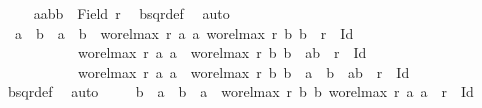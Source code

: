 \begin{isabellebody}
\ \ \isamarkupfalse%
\ {}{\isacharcolon}{\kern0pt}\ {\isachardoublequoteopen}{\isacharbraceleft}{\kern0pt}a{}{\isacharcomma}{\kern0pt}a{}{\isacharcomma}{\kern0pt}b{}{\isacharcomma}{\kern0pt}b{}{\isacharbraceright}{\kern0pt}\ {\isasymle}\ Field\ r{\isachardoublequoteclose}\ \isamarkupfalse%
\ bsqr{\isacharunderscore}{\kern0pt}def\ \isamarkupfalse%
\ auto\isanewline
\ \ \isamarkupfalse%
\ {}{\isacharcolon}{\kern0pt}\ {\isachardoublequoteopen}a{}\ {\isacharequal}{\kern0pt}\ b{}\ {\isasymand}\ a{}\ {\isacharequal}{\kern0pt}\ b{}\ {\isasymor}\ {\isacharparenleft}{\kern0pt}wo{\isacharunderscore}{\kern0pt}rel{\isachardot}{\kern0pt}max{}\ r\ a{}\ a{}{\isacharcomma}{\kern0pt}\ wo{\isacharunderscore}{\kern0pt}rel{\isachardot}{\kern0pt}max{}\ r\ b{}\ b{}{\isacharparenright}{\kern0pt}\ {\isasymin}\ r\ {\isacharminus}{\kern0pt}\ Id\ {\isasymor}\isanewline
\ \ \ \ \ \ \ \ \ \ \ wo{\isacharunderscore}{\kern0pt}rel{\isachardot}{\kern0pt}max{}\ r\ a{}\ a{}\ {\isacharequal}{\kern0pt}\ wo{\isacharunderscore}{\kern0pt}rel{\isachardot}{\kern0pt}max{}\ r\ b{}\ b{}\ {\isasymand}\ {\isacharparenleft}{\kern0pt}a{}{\isacharcomma}{\kern0pt}b{}{\isacharparenright}{\kern0pt}\ {\isasymin}\ r\ {\isacharminus}{\kern0pt}\ Id\ {\isasymor}\isanewline
\ \ \ \ \ \ \ \ \ \ \ wo{\isacharunderscore}{\kern0pt}rel{\isachardot}{\kern0pt}max{}\ r\ a{}\ a{}\ {\isacharequal}{\kern0pt}\ wo{\isacharunderscore}{\kern0pt}rel{\isachardot}{\kern0pt}max{}\ r\ b{}\ b{}\ {\isasymand}\ a{}\ {\isacharequal}{\kern0pt}\ b{}\ {\isasymand}\ {\isacharparenleft}{\kern0pt}a{}{\isacharcomma}{\kern0pt}b{}{\isacharparenright}{\kern0pt}\ {\isasymin}\ r\ {\isacharminus}{\kern0pt}\ Id{\isachardoublequoteclose}\isanewline
\ \ \isamarkupfalse%
\ {\isacharasterisk}{\kern0pt}\ \isamarkupfalse%
\ bsqr{\isacharunderscore}{\kern0pt}def\ \isamarkupfalse%
\ auto\isanewline
\ \ \isamarkupfalse%
\ {}{\isacharcolon}{\kern0pt}\ {\isachardoublequoteopen}b{}\ {\isacharequal}{\kern0pt}\ a{}\ {\isasymand}\ b{}\ {\isacharequal}{\kern0pt}\ a{}\ {\isasymor}\ {\isacharparenleft}{\kern0pt}wo{\isacharunderscore}{\kern0pt}rel{\isachardot}{\kern0pt}max{}\ r\ b{}\ b{}{\isacharcomma}{\kern0pt}\ wo{\isacharunderscore}{\kern0pt}rel{\isachardot}{\kern0pt}max{}\ r\ a{}\ a{}{\isacharparenright}{\kern0pt}\ {\isasymin}\ r\ {\isacharminus}{\kern0pt}\ Id\ {\isasymor}\isanewline

\end{isabellebody}
